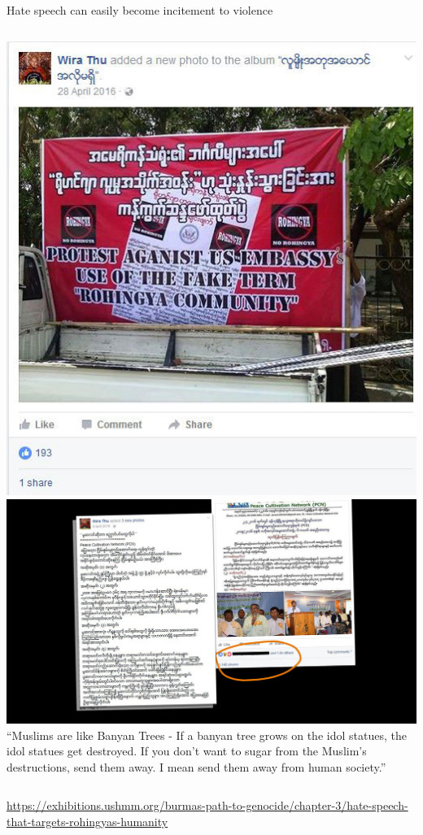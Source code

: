 \documentclass[nobackground,dvipsnames,table,aspectratio=169]{beamer}
\begin{document}
\begin{frame}{Hate speech can easily become incitement to violence}
    \begin{columns}[T]
            \includegraphics[width=\textwidth]{myanmar-incitement-1}
            \includegraphics[width=\textwidth]{myanmar-incitement-2}
            \footnotesize
            “Muslims are like Banyan Trees - If a banyan tree grows on the idol statues, the idol statues get destroyed. If you don’t want to sugar from the Muslim’s destructions, send them away. I mean send them away from human society.”
    \end{columns}
    \tiny
    \url{https://exhibitions.ushmm.org/burmas-path-to-genocide/chapter-3/hate-speech-that-targets-rohingyas-humanity}
\end{frame}
\end{document}
